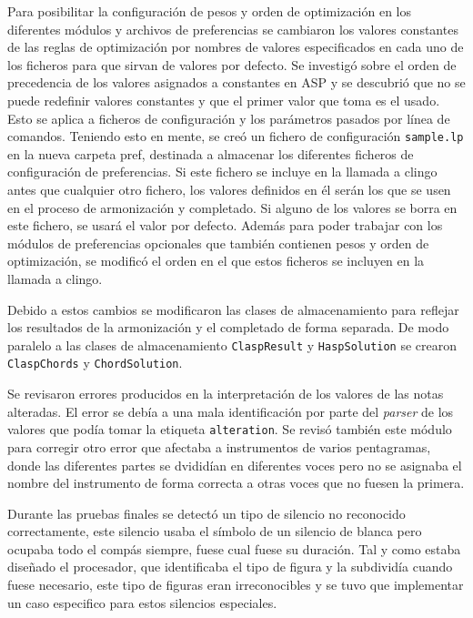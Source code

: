 Para posibilitar la configuración de pesos y orden de optimización en los diferentes módulos y archivos de preferencias se cambiaron los valores constantes de las reglas de optimización por nombres de valores especificados en cada uno de los ficheros para que sirvan de valores por defecto. Se investigó sobre el orden de precedencia de los valores asignados a constantes en ASP y se descubrió que no se puede redefinir valores constantes y que el primer valor que toma es el usado. Esto se aplica a ficheros de configuración y los parámetros pasados por línea de comandos. Teniendo esto en mente, se creó un fichero de configuración \texttt{sample.lp} en la nueva carpeta pref, destinada a almacenar los diferentes ficheros de configuración de preferencias. Si este fichero se incluye en la llamada a clingo antes que cualquier otro fichero, los valores definidos en él serán los que se usen en el proceso de armonización y completado. Si alguno de los valores se borra en este fichero, se usará el valor por defecto. Además para poder trabajar con los módulos de preferencias opcionales que también contienen pesos y orden de optimización, se modificó el orden en el que estos ficheros se incluyen en la llamada a clingo.

Debido a estos cambios se modificaron las clases de almacenamiento para reflejar los resultados de la armonización y el completado de forma separada. De modo paralelo a las clases de almacenamiento \texttt{ClaspResult} y \texttt{HaspSolution} se crearon \texttt{ClaspChords} y \texttt{ChordSolution}.

Se revisaron errores producidos en la interpretación de los valores de las notas alteradas. El error se debía a una mala identificación por parte del \textit{parser} de los valores que podía tomar la etiqueta \texttt{alteration}. Se revisó también este módulo para corregir otro error que afectaba a instrumentos de varios pentagramas, donde las diferentes partes se dvididían en diferentes voces pero no se asignaba el nombre del instrumento de forma correcta a otras voces que no fuesen la primera.

Durante las pruebas finales se detectó un tipo de silencio no reconocido correctamente, este silencio usaba el símbolo de un silencio de blanca pero ocupaba todo el compás siempre, fuese cual fuese su duración. Tal y como estaba diseñado el procesador, que identificaba el tipo de figura y la subdividía cuando fuese necesario, este tipo de figuras eran irreconocibles y se tuvo que implementar un caso especifico para estos silencios especiales. 

